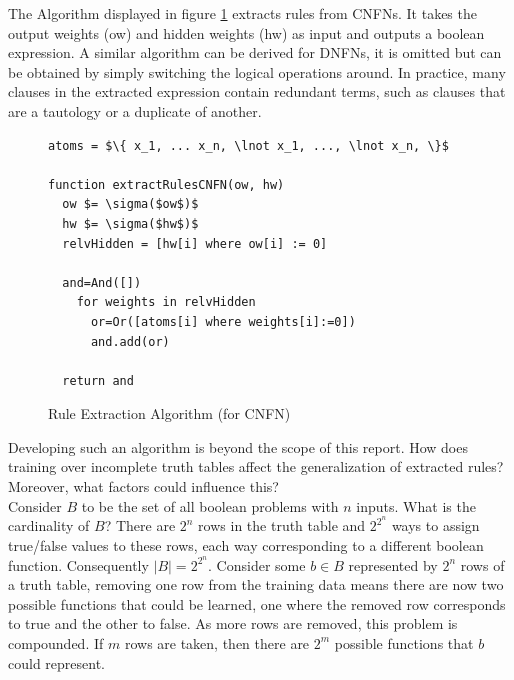 \noindent
\begin{minipage}[t]{0.3\textwidth}
\vspace{0px}
The Algorithm displayed in figure \ref{alg:rule-extraction} extracts rules from CNFNs. It takes the output weights (ow) and hidden weights (hw) as input and outputs a boolean expression. A similar algorithm can be derived for DNFNs, it is omitted but can be obtained by simply switching the logical operations around. In practice, many clauses in the extracted expression contain redundant terms, such as clauses that are a tautology or a duplicate of another.\\
\end{minipage}
\hspace{0.05\textwidth}
\begin{minipage}[t]{0.65\textwidth}
\vspace{0px}
\begin{figure}[H]
	\begin{lstlisting}[mathescape=true]
atoms = $\{ x_1, ... x_n, \lnot x_1, ..., \lnot x_n, \}$
	
function extractRulesCNFN(ow, hw)
  ow $= \sigma($ow$)$
  hw $= \sigma($hw$)$
  relvHidden = [hw[i] where ow[i] := 0]

  and=And([])
    for weights in relvHidden
      or=Or([atoms[i] where weights[i]:=0])
      and.add(or)
		
  return and
	\end{lstlisting}
	\caption{Rule Extraction Algorithm (for CNFN)}
	\label{alg:rule-extraction}
\end{figure}
\end{minipage}

Developing such an algorithm is beyond the scope of this report. How does training over incomplete truth tables affect the generalization of extracted rules? Moreover, what factors could influence this?\\

Consider $B$ to be the set of all boolean problems with $n$ inputs. What is the cardinality of $B$? There are $2^n$ rows in the truth table and $2^{2^n}$ ways to assign true/false values to these rows, each way corresponding to a different boolean function. Consequently $|B| = 2^{2^n}$. Consider some $b \in B$ represented by $2^n$ rows of a truth table, removing one row from the training data means there are now two possible functions that could be learned, one where the removed row corresponds to true and the other to false. As more rows are removed, this problem is compounded. If $m$ rows are taken, then there are $2^m$ possible functions that $b$ could represent.\\


